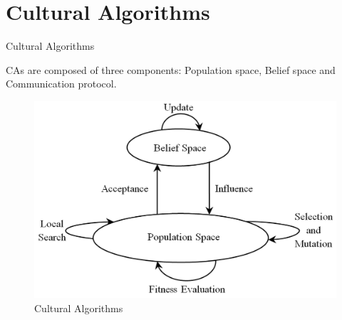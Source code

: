 \documentclass[table]{beamer}
\begin{document}
	\section{Cultural Algorithms}
	
	\begin{frame}{Cultural Algorithms}
		\justifying
		\begin{block}{}
		CAs are composed of three components: \alert{Population space}, \alert{Belief space} and \alert{Communication protocol}.
		\end{block}
		\begin{figure}[v]
			\includegraphics[scale=0.09]{CA}
			\centering
			\caption{Cultural Algorithms}
			\label{ref:CA}
		\end{figure}
	\end{frame}
	
	
\end{document}
